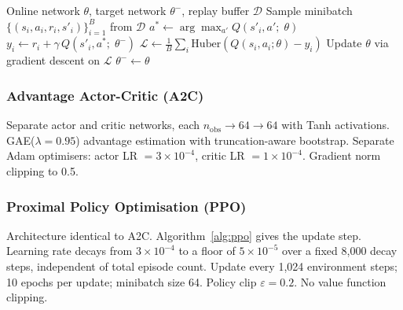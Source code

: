 \documentclass[a4paper,12pt]{article}
\begin{document}
\begin{algorithm}[H]
\caption{Double DQN --- Optimise Step}
\label{alg:ddqn}
\begin{algorithmic}[1]
\Input Online network $\theta$, target network $\theta^-$, replay buffer $\mathcal{D}$
\State Sample minibatch $\{(s_i, a_i, r_i, s'_i)\}_{i=1}^{B}$ from $\mathcal{D}$
  \State $a^* \leftarrow \arg\max_{a'} Q(s'_i, a';\; \theta)$ 
  \State $y_i \leftarrow r_i + \gamma\, Q(s'_i, a^*;\; \theta^-)$ 
\EndFor
\State $\mathcal{L} \leftarrow \tfrac{1}{B}\sum_i \text{Huber}\!\left(Q(s_i,a_i;\theta) - y_i\right)$
\State Update $\theta$ via gradient descent on $\mathcal{L}$
 $\theta^- \leftarrow \theta$ \EndIf
\end{algorithmic}
\end{algorithm}

\subsubsection{Advantage Actor-Critic (A2C)}

Separate actor and critic networks, each $n_{\text{obs}} \to 64 \to 64$ with Tanh activations. GAE($\lambda=0.95$) advantage estimation with truncation-aware bootstrap. Separate Adam optimisers: actor LR $= 3\times10^{-4}$, critic LR $= 1\times10^{-4}$. Gradient norm clipping to 0.5.

\subsubsection{Proximal Policy Optimisation (PPO)}

Architecture identical to A2C. Algorithm~\ref{alg:ppo} gives the update step. Learning rate decays from $3\times10^{-4}$ to a floor of $5\times10^{-5}$ over a fixed 8,000 decay steps, independent of total episode count. Update every 1,024 environment steps; 10 epochs per update; minibatch size 64. Policy clip $\varepsilon=0.2$. No value function clipping.
\end{document}
